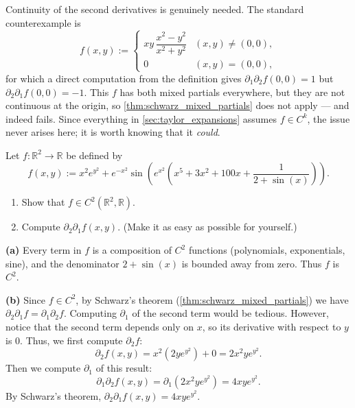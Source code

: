 \begin{remark}
\label{rem:schwarz_needs_c2}
Continuity of the second derivatives is genuinely needed. The standard counterexample is
\[f(x,y) := \begin{cases} xy\,\dfrac{x^2-y^2}{x^2+y^2} & (x,y)\neq(0,0), \\[1ex]
  0 & (x,y)=(0,0),\end{cases}\]
for which a direct computation from the definition gives
$\partial_1\partial_2 f(0,0) = 1$ but $\partial_2\partial_1 f(0,0) = -1$. This $f$ has both
mixed partials everywhere, but they are not continuous at the origin, so
\cref{thm:schwarz_mixed_partials} does not apply --- and indeed fails. Since everything in
\cref{sec:taylor_expansions} assumes $f \in C^k$, the issue never arises here; it is worth
knowing that it \emph{could}.
\end{remark}

\begin{exercise}
\label{ex:schwarz_application}
Let $f : \mathbb{R}^2 \to \mathbb{R}$ be defined by
\[f(x,y) := x^2 e^{y^2} + e^{-x^2} \sin\left(e^{x^2} \left(x^5 + 3x^2 + 100x + \frac{1}{2+\sin(x)}\right)\right).\]
\begin{enumerate}[label=\textbf{(\alph*)}]
  \item Show that $f \in C^2(\mathbb{R}^2, \mathbb{R})$.
  \item Compute $\partial_2 \partial_1 f(x,y)$. (Make it as easy as possible for yourself.)
\end{enumerate}
\end{exercise}

\begin{exercisesolution}
\textbf{(a)} Every term in $f$ is a composition of $C^2$ functions (polynomials, exponentials, sine), and the denominator $2+\sin(x)$ is bounded away from zero. Thus $f$ is $C^2$.

\textbf{(b)} Since $f \in C^2$, by Schwarz's theorem (\cref{thm:schwarz_mixed_partials}) we have $\partial_2 \partial_1 f = \partial_1 \partial_2 f$.
Computing $\partial_1$ of the second term would be tedious. However, notice that the second term depends only on $x$, so its derivative with respect to $y$ is $0$.
Thus, we first compute $\partial_2 f$:
\[\partial_2 f(x,y) = x^2 (2y e^{y^2}) + 0 = 2x^2 y e^{y^2}.\]
Then we compute $\partial_1$ of this result:
\[\partial_1 \partial_2 f(x,y) = \partial_1 (2x^2 y e^{y^2}) = 4xy e^{y^2}.\]
By Schwarz's theorem, $\partial_2 \partial_1 f(x,y) = 4xy e^{y^2}$.
\end{exercisesolution}

